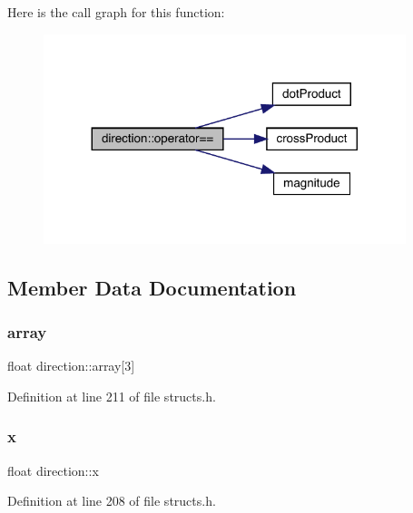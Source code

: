 Here is the call graph for this function\+:
\nopagebreak
\begin{figure}[H]
\begin{center}
\leavevmode
\includegraphics[width=299pt]{structdirection_a07af488d6fa8d5b140fedf087f6d62d9_cgraph}
\end{center}
\end{figure}


\subsection{Member Data Documentation}
\mbox{\label{structdirection_a63c93cc6656f46d483d80a6fbbd2f5b0}} 
\subsubsection{\texorpdfstring{array}{array}}
{\footnotesize\ttfamily float direction\+::array\mbox{[}3\mbox{]}}



Definition at line 211 of file structs.\+h.

\mbox{\label{structdirection_a19fc7fb15e44643c1816108b180c875c}} 
\subsubsection{\texorpdfstring{x}{x}}
{\footnotesize\ttfamily float direction\+::x}



Definition at line 208 of file structs.\+h.

\mbox{\label{structdirection_a8b42de830050ebb6df61e00178677d4a}} 
